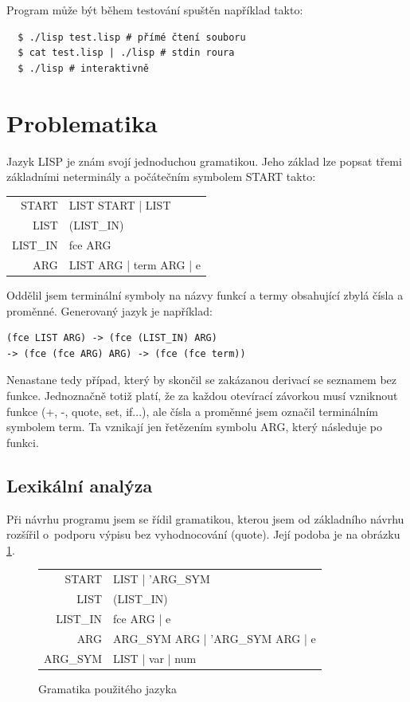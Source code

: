 \documentclass[a4paper, 12pt]{article}
\begin{document}
Program může být během testování spuštěn například takto:
\begin{verbatim}
  $ ./lisp test.lisp # přímé čtení souboru
  $ cat test.lisp | ./lisp # stdin roura
  $ ./lisp # interaktivně
\end{verbatim}

\section{Problematika}
Jazyk LISP je znám svojí jednoduchou gramatikou.
Jeho základ lze popsat třemi základními neterminály a počátečním
symbolem START takto: 

\medskip

\begin{tabular}{r@{$\quad\longrightarrow\quad$}l}
START & LIST START | LIST\\
LIST & (LIST\_IN)\\
LIST\_IN & fce ARG\\
ARG & LIST ARG | term ARG | e
\end{tabular}

Oddělil jsem terminální symboly na názvy funkcí a termy obsahující
zbylá čísla a proměnné. Generovaný jazyk je například:

\begin{verbatim}
(fce LIST ARG) -> (fce (LIST_IN) ARG)
-> (fce (fce ARG) ARG) -> (fce (fce term))
\end{verbatim}

Nenastane tedy případ, který by skončil se zakázanou derivací
se seznamem bez funkce.
Jednoznačně totiž platí, že za každou otevírací závorkou musí
vzniknout funkce (+, -, quote, set, if...), ale čísla a proměnné
jsem označil terminálním symbolem term. Ta vznikají jen řetězením
symbolu ARG, který následuje po funkci.

\subsection{Lexikální analýza}
Při návrhu programu jsem se řídil gramatikou, kterou jsem od
základního návrhu rozšířil o~podporu výpisu bez vyhodnocování (quote).
Její podoba je na obrázku \ref{fig:gram}.

\begin{figure}
\centering
\begin{tabular}{r@{$\quad\longrightarrow\quad$}l}
START & LIST | 'ARG\_SYM\\
LIST & (LIST\_IN)\\
LIST\_IN & fce ARG | e\\
ARG & ARG\_SYM ARG | 'ARG\_SYM ARG | e\\
ARG\_SYM & LIST | var | num
\end{tabular}
\caption{Gramatika použitého jazyka}
\label{fig:gram}
\end{figure}
\end{document}
